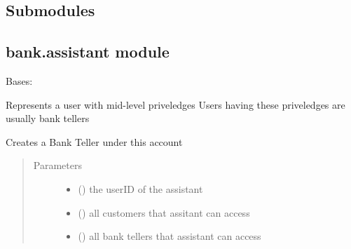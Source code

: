 \documentclass[letterpaper,10pt,english]{sphinxmanual}
\begin{document}
\subsection{Submodules}
\label{\detokenize{bank:submodules}}

\subsection{bank.assistant module}
\label{\detokenize{bank:module-bank.assistant}}\label{\detokenize{bank:bank-assistant-module}}

\begin{fulllineitems}
\label{\detokenize{bank:bank.assistant.Assistant}}
Bases: 

Represents a user with mid-level priveledges
Users having these priveledges are usually bank tellers

\begin{fulllineitems}
\label{\detokenize{bank:bank.assistant.Assistant.createBankTeller}}
Creates a Bank Teller under this account
\begin{quote}\begin{description}
\item[{Parameters}] \leavevmode\begin{itemize}
\item {} 
 () \textendash{} the userID of the assistant

\item {} 
 () \textendash{} all customers that assitant can access

\item {} 
 () \textendash{} all bank tellers that assistant can access

\end{itemize}


\end{description}
\end{quote}
\end{fulllineitems}
\end{fulllineitems}
\end{document}
